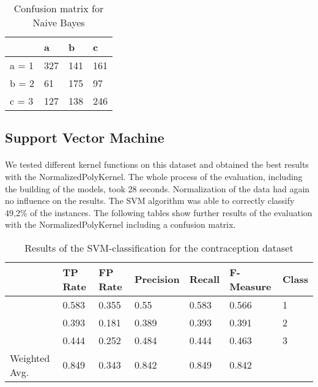 \documentclass[paper=a4, fontsize=11pt]{scrartcl} %
\numberwithin{equation}{section} %
\numberwithin{figure}{section} %
\numberwithin{table}{section} %
\begin{document}
\begin{table}[h]
\centering
\begin{tabular}{|l|lll|}
\hline
              &   a &   b &   c  \\
\hline
 a = 1        & 327 & 141 & 161  \\
 b = 2        &  61 & 175 &  97  \\
 c = 3        & 127 & 138 & 246  \\
\hline
\end{tabular}
\caption{Confusion matrix for Naive Bayes}
\label{tab:contra:bayes:1c}
\end{table}


\subsection{Support Vector Machine}

\paragraph{}We tested different kernel functions on this dataset and obtained the best results with the NormalizedPolyKernel. The whole process of the evaluation, including the building of the models, took 28 seconds. Normalization of the data had again no influence on the results. The SVM algorithm was able to correctly classify 49,2\% of the instances. The following tables show further results of the evaluation with the NormalizedPolyKernel including a confusion matrix.

\begin{table}[htb]
\centering
\begin{tabular}{lllllll}
	\toprule
	&								TP Rate   	&FP Rate   &Precision   &Recall  &F-Measure     	&Class\\ 
	\midrule
									&0.583     	&0.355     &0.55      	&0.583   &0.566   		    	&1\\
                 	&0.393     	&0.181     &0.389     	&0.393   &0.391      	    	&2\\
                 	&0.444     	&0.252     &0.484     	&0.444   &0.463      	    	&3\\
	Weighted Avg.   & 0.849    & 0.343      &0.842   &  0.849     &0.842     			&\\
	\bottomrule
\end{tabular}
\caption{Results of the SVM-classification for the contraception dataset}
\end{table}

\vspace{6pt}
\end{document}
